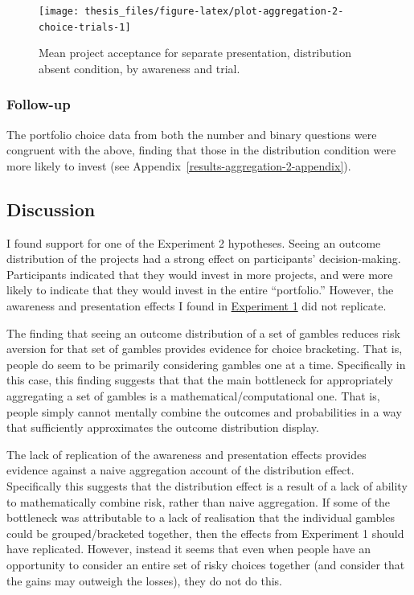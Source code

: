 \documentclass[a4paper, nobind, dvipsnames]{templates/ociamthesis}
\theoremstyle{definition}
\theoremstyle{definition}
\theoremstyle{definition}
\theoremstyle{definition}
\theoremstyle{remark}
\begin{document}
\begin{figure}
\texttt{[image: thesis\_files/figure-latex/plot-aggregation-2-choice-trials-1]} \caption{Mean project acceptance for separate presentation, distribution absent condition, by awareness and trial.}\label{fig:plot-aggregation-2-choice-trials}
\end{figure}

\hypertarget{follow-up}{%
\subsubsection{Follow-up}\label{follow-up}}

The portfolio choice data from both the number and binary questions were
congruent with the above, finding that those in the distribution condition were
more likely to invest (see Appendix~\ref{results-aggregation-2-appendix}).

\hypertarget{discussion}{%
\subsection{Discussion}\label{discussion}}

I found support for one of the Experiment 2 hypotheses. Seeing an outcome
distribution of the projects had a strong effect on participants'
decision-making. Participants indicated that they would invest in more projects,
and were more likely to indicate that they would invest in the entire
``portfolio.'' However, the awareness and presentation effects I found in
\protect\hyperlink{results-aggregation-1}{Experiment 1} did not replicate.

The finding that seeing an outcome distribution of a set of gambles reduces risk
aversion for that set of gambles provides evidence for choice bracketing. That
is, people do seem to be primarily considering gambles one at a time.
Specifically in this case, this finding suggests that that the main bottleneck
for appropriately aggregating a set of gambles is a mathematical/computational
one. That is, people simply cannot mentally combine the outcomes and
probabilities in a way that sufficiently approximates the outcome distribution
display.

The lack of replication of the awareness and presentation effects provides
evidence against a naive aggregation account of the distribution effect.
Specifically this suggests that the distribution effect is a result of a lack of
ability to mathematically combine risk, rather than naive aggregation. If some
of the bottleneck was attributable to a lack of realisation that the individual
gambles could be grouped/bracketed together, then the effects from Experiment 1
should have replicated. However, instead it seems that even when people have an
opportunity to consider an entire set of risky choices together (and consider
that the gains may outweigh the losses), they do not do this.
\end{document}
